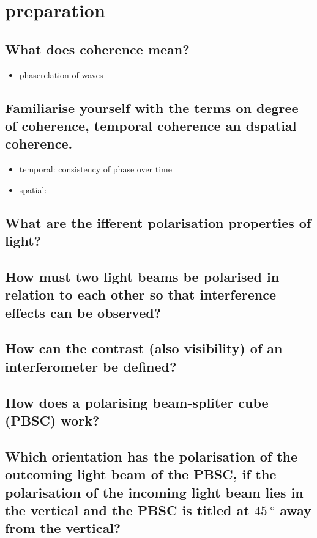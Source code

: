 \section{preparation}

\subsection*{What does coherence mean?}
\begin{itemize}
    \item phaserelation of waves
\end{itemize}
\subsection*{Familiarise yourself with the terms on degree of coherence, temporal coherence an dspatial coherence.}
\begin{itemize}
    \item temporal: consistency of phase over time 
    \item spatial: 
\end{itemize}

\subsection*{What are the ifferent polarisation properties of light?}
\subsection*{How must two light beams be polarised in relation to each other so that interference effects can be observed?}

\subsection*{How can the contrast (also visibility) of an interferometer be defined?}

\subsection*{How does a polarising beam-spliter cube (PBSC) work?}
\subsection*{Which orientation has the polarisation of the outcoming light beam of the PBSC, if the polarisation of the incoming light beam lies in the vertical and the PBSC is titled at $\SI{45}{\degree}$ away from the vertical?}

